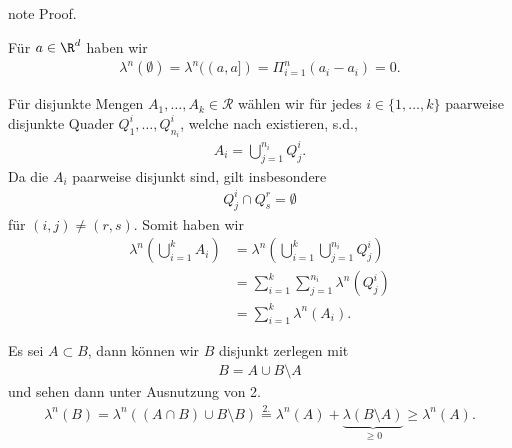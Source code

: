 \documentclass[letterpaper,10pt,english]{jupyterBook}
\begin{document}
\begin{sphinxadmonition}{note}
\sphinxAtStartPar
Proof. 

\sphinxAtStartPar
Für \(a\in\R^d\) haben wir
\begin{equation*}
\begin{split}\lambda^n(\emptyset) = \lambda^n((a,a]) = \Pi_{i=1}^n (a_i - a_i) = 0.\end{split}
\end{equation*}
\sphinxAtStartPar
{}

\sphinxAtStartPar
Für disjunkte Mengen \(A_1,\ldots, A_k\in\mathcal{R}\) wählen wir für jedes \(i\in\{1,\ldots,k\}\) paarweise disjunkte Quader
\(Q^i_1,\ldots, Q^i_{n_i}\), welche nach {\hyperref[\detokenize{masstheorie/masstheorie:lem:disRect}]{}} existieren, s.d.,
\begin{equation*}
\begin{split}A_i = \bigcup_{j=1}^{n_i} Q^i_j.\end{split}
\end{equation*}
\sphinxAtStartPar
Da die \(A_i\) paarweise disjunkt sind, gilt insbesondere
\begin{equation*}
\begin{split}Q^i_j \cap Q^r_s = \emptyset\end{split}
\end{equation*}
\sphinxAtStartPar
für \((i,j)\neq (r,s)\). Somit haben wir
\begin{equation*}
\begin{split}\lambda^n\left(\bigcup_{i=1}^k A_i \right) &= \lambda^n\left(\bigcup_{i=1}^k \bigcup_{j=1}^{n_i} Q^i_j \right) 
\\&=
\sum_{i=1}^k \sum_{j=1}^{n_i} \lambda^n(Q^i_j)
\\&= 
\sum_{i=1}^k \lambda^n(A_i).\end{split}
\end{equation*}
\sphinxAtStartPar
{}

\sphinxAtStartPar
Es sei \(A\subset B\), dann können wir \(B\) disjunkt zerlegen mit
\begin{equation*}
\begin{split}B = A \cup B\setminus A\end{split}
\end{equation*}
\sphinxAtStartPar
und sehen dann unter Ausnutzung von 2.
\begin{equation*}
\begin{split}\lambda^n(B) = \lambda^n((A\cap B)\cup B\setminus B) \overset{2.}{=} 
\lambda^n(A) + \underbrace{\lambda(B\setminus A)}_{\geq 0} \geq \lambda^n(A).\end{split}
\end{equation*}
\sphinxAtStartPar
{}


\end{sphinxadmonition}
\end{document}
